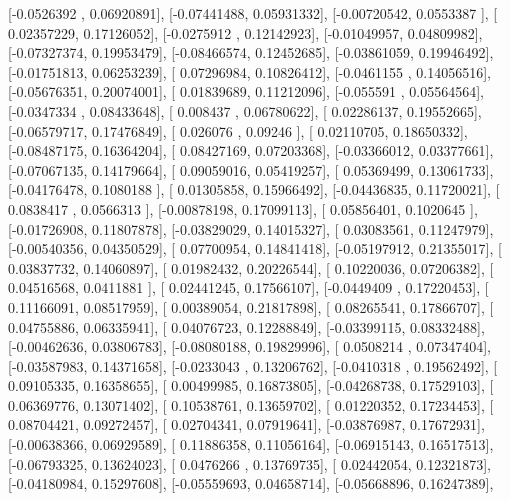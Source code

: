 \documentclass{article}
\begin{document}
       [-0.0526392 ,  0.06920891],
       [-0.07441488,  0.05931332],
       [-0.00720542,  0.0553387 ],
       [ 0.02357229,  0.17126052],
       [-0.0275912 ,  0.12142923],
       [-0.01049957,  0.04809982],
       [-0.07327374,  0.19953479],
       [-0.08466574,  0.12452685],
       [-0.03861059,  0.19946492],
       [-0.01751813,  0.06253239],
       [ 0.07296984,  0.10826412],
       [-0.0461155 ,  0.14056516],
       [-0.05676351,  0.20074001],
       [ 0.01839689,  0.11212096],
       [-0.055591  ,  0.05564564],
       [-0.0347334 ,  0.08433648],
       [ 0.008437  ,  0.06780622],
       [ 0.02286137,  0.19552665],
       [-0.06579717,  0.17476849],
       [ 0.026076  ,  0.09246   ],
       [ 0.02110705,  0.18650332],
       [-0.08487175,  0.16364204],
       [ 0.08427169,  0.07203368],
       [-0.03366012,  0.03377661],
       [-0.07067135,  0.14179664],
       [ 0.09059016,  0.05419257],
       [ 0.05369499,  0.13061733],
       [-0.04176478,  0.1080188 ],
       [ 0.01305858,  0.15966492],
       [-0.04436835,  0.11720021],
       [ 0.0838417 ,  0.0566313 ],
       [-0.00878198,  0.17099113],
       [ 0.05856401,  0.1020645 ],
       [-0.01726908,  0.11807878],
       [-0.03829029,  0.14015327],
       [ 0.03083561,  0.11247979],
       [-0.00540356,  0.04350529],
       [ 0.07700954,  0.14841418],
       [-0.05197912,  0.21355017],
       [ 0.03837732,  0.14060897],
       [ 0.01982432,  0.20226544],
       [ 0.10220036,  0.07206382],
       [ 0.04516568,  0.0411881 ],
       [ 0.02441245,  0.17566107],
       [-0.0449409 ,  0.17220453],
       [ 0.11166091,  0.08517959],
       [ 0.00389054,  0.21817898],
       [ 0.08265541,  0.17866707],
       [ 0.04755886,  0.06335941],
       [ 0.04076723,  0.12288849],
       [-0.03399115,  0.08332488],
       [-0.00462636,  0.03806783],
       [-0.08080188,  0.19829996],
       [ 0.0508214 ,  0.07347404],
       [-0.03587983,  0.14371658],
       [-0.0233043 ,  0.13206762],
       [-0.0410318 ,  0.19562492],
       [ 0.09105335,  0.16358655],
       [ 0.00499985,  0.16873805],
       [-0.04268738,  0.17529103],
       [ 0.06369776,  0.13071402],
       [ 0.10538761,  0.13659702],
       [ 0.01220352,  0.17234453],
       [ 0.08704421,  0.09272457],
       [ 0.02704341,  0.07919641],
       [-0.03876987,  0.17672931],
       [-0.00638366,  0.06929589],
       [ 0.11886358,  0.11056164],
       [-0.06915143,  0.16517513],
       [-0.06793325,  0.13624023],
       [ 0.0476266 ,  0.13769735],
       [ 0.02442054,  0.12321873],
       [-0.04180984,  0.15297608],
       [-0.05559693,  0.04658714],
       [-0.05668896,  0.16247389],
\end{document}
